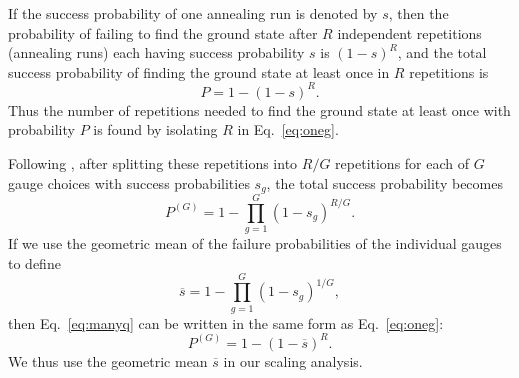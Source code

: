 If the success probability of one annealing run is denoted by $s$, then the probability of failing to find the ground state after $R$ independent repetitions (annealing runs) each having success probability $s$ is $(1-s)^R$, and the total success probability of finding the ground state at least once in $R$ repetitions is
\begin{equation}
 P=1-(1-s)^R .
 \label{eq:oneg}
 \end{equation}
Thus the number of repetitions needed to find the ground state at least once with probability $P$ is found by isolating $R$ in Eq.~\eqref{eq:oneg}.

Following \cite{ourpaper}, after splitting these repetitions into $R/G$ repetitions for each of $G$ gauge choices with success probabilities $s_g$, the total success probability becomes
 \begin{equation}
 P^{(G)} = 1-\prod_{g=1}^G(1-s_g)^{R/G}.
 \label{eq:manyq}
 \end{equation}
If we use the geometric mean of the failure probabilities of the individual gauges to define
 \begin{equation}
\overline{s} = 1-\prod_{g=1}^G(1-s_g)^{1/G},
 \end{equation}
then Eq.~\eqref{eq:manyq} can be written in the same form as Eq.~\eqref{eq:oneg}:
\begin{equation}
 P^{(G)}=1-(1-\overline{s})^R.
 \label{eq:onegav}
 \end{equation}
We thus use the geometric mean $\overline{s}$ in our scaling analysis.\\

